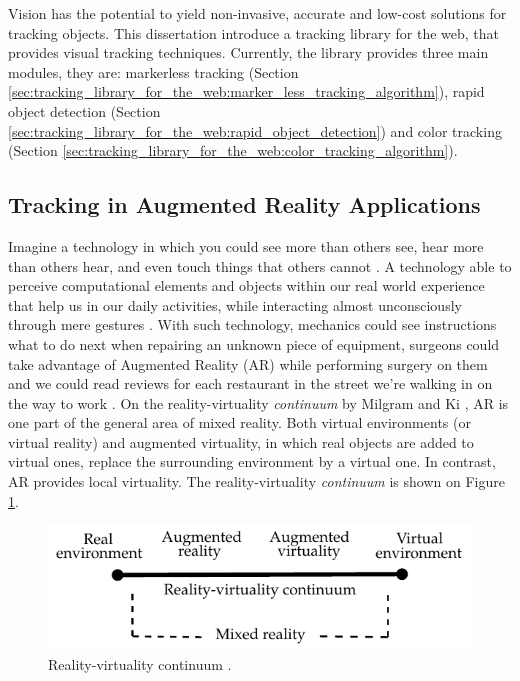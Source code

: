 Vision has the potential to yield non-invasive, accurate and low-cost solutions for tracking objects. This dissertation introduce a tracking library for the web, that provides visual tracking techniques. Currently, the library provides three main modules, they are: markerless tracking (Section \ref{sec:tracking_library_for_the_web:marker_less_tracking_algorithm}), rapid object detection (Section \ref{sec:tracking_library_for_the_web:rapid_object_detection}) and color tracking (Section \ref{sec:tracking_library_for_the_web:color_tracking_algorithm}).


\subsection{Tracking in Augmented Reality Applications} %
\label{sub:basic_concepts:visual_tracking:tracking_in_augmented_reality_applications}

Imagine a technology in which you could see more than others see, hear more than others hear, and even touch things that others cannot \cite{Krevelen2010}. A technology able to perceive computational elements and objects within our real world experience that help us in our daily activities, while interacting almost unconsciously through mere gestures \cite{Krevelen2010,Teichrieb2007}. With such technology, mechanics could see instructions what to do next when repairing an unknown piece of equipment, surgeons could take advantage of Augmented Reality (AR) while performing surgery on them and we could read reviews for each restaurant in the street we're walking in on the way to work \cite{Krevelen2010}. On the reality-virtuality \textit{continuum} by Milgram and Ki \cite{Mistry2009}, AR is one part of the general area of mixed reality. Both virtual environments (or virtual reality) and augmented virtuality, in which real objects are added to virtual ones, replace the surrounding environment by a virtual one. In contrast, AR provides local virtuality. The reality-virtuality \textit{continuum} is shown on Figure \ref{figure:reality_continuum}.

\begin{figure}[!htb]
  \centering
  \includegraphics{chapters/basic_concepts/reality_continuum.pdf}
  \caption{Reality-virtuality continuum \cite{Benford1998}.}
  \label{figure:reality_continuum}
\end{figure}

